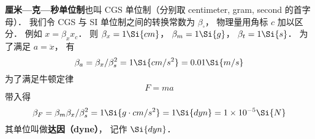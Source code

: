 
\textbf{厘米—克—秒单位制}也叫 CGS 单位制（分别取 centimeter, gram, second 的首字母）． 我们令 CGS 与 SI 单位制之间的转换常数为 $\beta_\square$， 物理量用角标 $c$ 加以区分． 例如 $x = \beta_x x_c$． 则 $\beta_x = 1\Si{cm}$， $\beta_m = 1\Si{g}$， $\beta_t = 1\Si{s}$．
为了满足 $a = \ddot x$， 有
\begin{equation}
\beta_a = \beta_x/\beta_s^2 = 1\Si{cm/s^2} = 0.01 \Si{m/s}
\end{equation}
为了满足牛顿定律
\begin{equation}
F = ma
\end{equation}
带入得
\begin{equation}
\beta_F = \beta_m \beta_x/\beta_s^2 = 1\Si{g \cdot cm/s^2} = 1\Si{dyn} = 1\times 10^{-5} \Si{N}
\end{equation}
其单位叫做\textbf{达因（dyne）}， 记作 $\Si{dyn}$．
